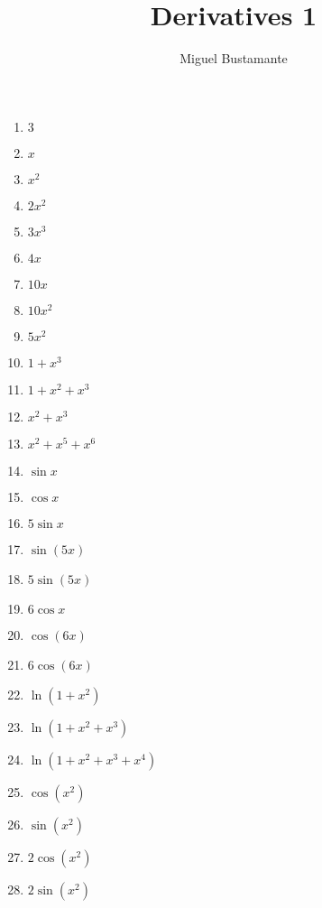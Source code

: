 \documentclass{article}
\title{Derivatives 1}
\author{Miguel Bustamante}
\begin{document}
\maketitle
\begin{multicols}{3} %
\begin{enumerate}
    \item $3$
    \item $x$
    \item $x^2$
    \item $2x^2$
    \item $3x^3$
    \item $4x$
    \item $10x$
    \item $10x^2$
    \item $5x^2$
    \item $1+x^3$
    \item $1+x^2+x^3$
    \item $x^2+x^3$
    \item $x^2+x^5+x^6$
    \item $\sin x$
    \item $\cos x$
    \item $5\sin x$
    \item $\sin(5x)$
    \item $5\sin(5x)$
    \item $6\cos x$
    \item $\cos(6x)$
    \item $6\cos(6x)$
    \item $\ln(1+x^2)$
    \item $\ln(1+x^2+x^3)$
    \item $\ln(1+x^2+x^3+x^4)$
    \item $\cos(x^2)$
    \item $\sin(x^2)$
    \item $2\cos(x^2)$
    \item $2\sin(x^2)$
\end{enumerate}
\end{multicols}
\end{document}
